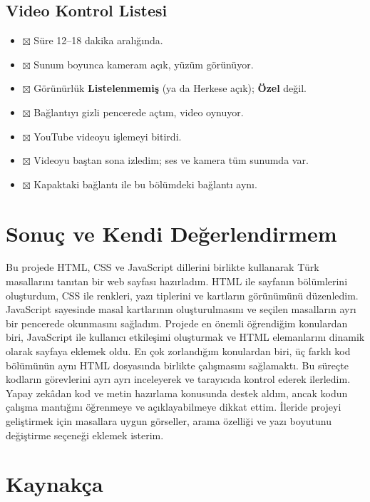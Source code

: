 \documentclass[12pt,a4paper]{article}
\begin{document}
\subsection{Video Kontrol Listesi}
\begin{itemize}[label={}]
  \item $\boxtimes$ Süre 12--18 dakika aralığında.
  \item $\boxtimes$ Sunum boyunca kameram açık, yüzüm görünüyor.
  \item $\boxtimes$ Görünürlük \textbf{Listelenmemiş} (ya da Herkese açık); \textbf{Özel} değil.
  \item $\boxtimes$ Bağlantıyı gizli pencerede açtım, video oynuyor.
  \item $\boxtimes$ YouTube videoyu işlemeyi bitirdi.
  \item $\boxtimes$ Videoyu baştan sona izledim; ses ve kamera tüm sunumda var.
  \item $\boxtimes$ Kapaktaki bağlantı ile bu bölümdeki bağlantı aynı.
\end{itemize}

\section{Sonuç ve Kendi Değerlendirmem}
Bu projede HTML, CSS ve JavaScript dillerini birlikte kullanarak Türk masallarını tanıtan bir web sayfası hazırladım. HTML ile sayfanın bölümlerini oluşturdum, CSS ile renkleri, yazı tiplerini ve kartların görünümünü düzenledim. JavaScript sayesinde masal kartlarının oluşturulmasını ve seçilen masalların ayrı bir pencerede okunmasını sağladım. Projede en önemli öğrendiğim konulardan biri, JavaScript ile kullanıcı etkileşimi oluşturmak ve HTML elemanlarını dinamik olarak sayfaya eklemek oldu. En çok zorlandığım konulardan biri, üç farklı kod bölümünün aynı HTML dosyasında birlikte çalışmasını sağlamaktı. Bu süreçte kodların görevlerini ayrı ayrı inceleyerek ve tarayıcıda kontrol ederek ilerledim. Yapay zekâdan kod ve metin hazırlama konusunda destek aldım, ancak kodun çalışma mantığını öğrenmeye ve açıklayabilmeye dikkat ettim. İleride projeyi geliştirmek için masallara uygun görseller, arama özelliği ve yazı boyutunu değiştirme seçeneği eklemek isterim.

\section{Kaynakça}
\end{document}
